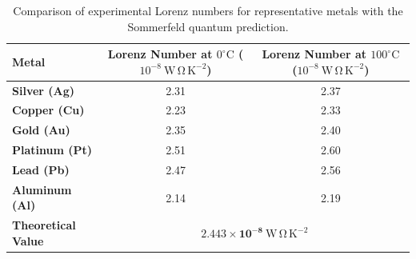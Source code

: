 \documentclass[11pt,a4paper]{article}
\begin{document}
\begin{table}[ht]
\centering
\small
\renewcommand{\arraystretch}{1.25}
\begin{tabular}{lcc}
\toprule
\textbf{Metal} & \textbf{Lorenz Number at $0^\circ\mathrm{C}$} ($10^{-8}\ \mathrm{W\,\Omega\,K^{-2}}$) & \textbf{Lorenz Number at $100^\circ\mathrm{C}$} ($10^{-8}\ \mathrm{W\,\Omega\,K^{-2}}$) \\
\midrule
\textbf{Silver (Ag)}    & 2.31 & 2.37 \\
\textbf{Copper (Cu)}    & 2.23 & 2.33 \\
\textbf{Gold (Au)}      & 2.35 & 2.40 \\
\textbf{Platinum (Pt)}  & 2.51 & 2.60 \\
\textbf{Lead (Pb)}      & 2.47 & 2.56 \\
\textbf{Aluminum (Al)}  & 2.14 & 2.19 \\
\midrule
\textbf{Theoretical Value} & \multicolumn{2}{c}{$\mathbf{2.443 \times 10^{-8}\ \mathrm{W\,\Omega\,K^{-2}}}$} \\
\bottomrule
\end{tabular}
\caption{Comparison of experimental Lorenz numbers for representative metals with the Sommerfeld quantum prediction.}
\label{tab:lorenz_table}
\end{table}

\vspace{0.4cm}
\end{document}
